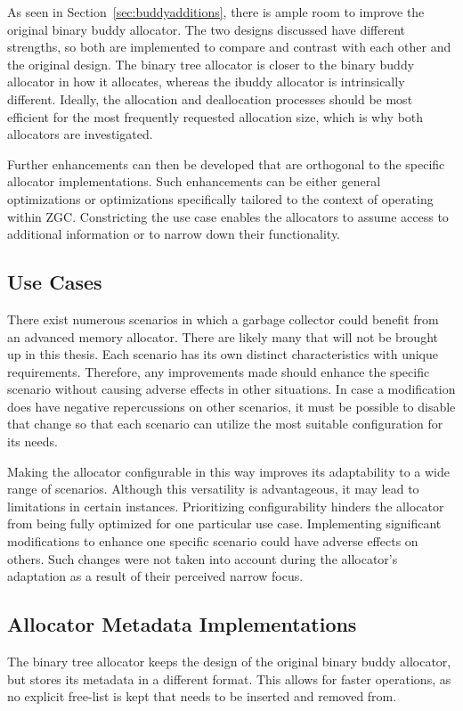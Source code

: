 As seen in Section~\ref{sec:buddyadditions}, there is ample room to improve the original binary buddy allocator. The two designs discussed have different strengths, so both are implemented to compare and contrast with each other and the original design. The binary tree allocator is closer to the binary buddy allocator in how it allocates, whereas the ibuddy allocator is intrinsically different. Ideally, the allocation and deallocation processes should be most efficient for the most frequently requested allocation size, which is why both allocators are investigated.

Further enhancements can then be developed that are orthogonal to the specific allocator implementations. Such enhancements can be either general optimizations or optimizations specifically tailored to the context of operating within ZGC. Constricting the use case enables the allocators to assume access to additional information or to narrow down their functionality.

\subsection{Use Cases}
There exist numerous scenarios in which a garbage collector could benefit from an advanced memory allocator. There are likely many that will not be brought up in this thesis. Each scenario has its own distinct characteristics with unique requirements. Therefore, any improvements made should enhance the specific scenario without causing adverse effects in other situations. In case a modification does have negative repercussions on other scenarios, it must be possible to disable that change so that each scenario can utilize the most suitable configuration for its needs.

\newpage
Making the allocator configurable in this way improves its adaptability to a wide range of scenarios. Although this versatility is advantageous, it may lead to limitations in certain instances. Prioritizing configurability hinders the allocator from being fully optimized for one particular use case. Implementing significant modifications to enhance one specific scenario could have adverse effects on others. Such changes were not taken into account during the allocator's adaptation as a result of their perceived narrow focus.

\subsection{Allocator Metadata Implementations} \label{sec:adaptationsmetadata}
The binary tree allocator keeps the design of the original binary buddy allocator, but stores its metadata in a different format. This allows for faster operations, as no explicit free-list is kept that needs to be inserted and removed from.

